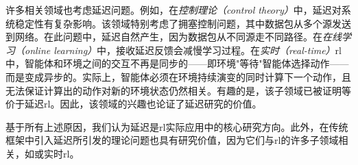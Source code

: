 许多相关领域也考虑延迟问题。例如，在\emph{控制理论（control theory）}中\cite{chung1995time, dugard1998stability, niculescu2001delay, gu2003survey, richard2003time, fridman2014introduction}，延迟对系统稳定性有复杂影响\cite{kolmanovskii1999delay}。该领域特别考虑了拥塞控制问题，其中数据包从多个源发送到网络\cite{jacobson1988congestion}。在此问题中，延迟自然产生，因为数据包从不同源走不同路径\cite{witsenhausen1971separation, altman1999congestion,ait2003stability}。在\emph{在线学习（online learning）}中，接收延迟反馈会减慢学习过程\cite{joulani2013online,pike2018bandits,lancewicki2021stochastic}。在\emph{实时（real-time）}\gls{rl}中，智能体和环境之间的交互不再是同步的——即环境"等待"智能体选择动作——而是变成异步的。实际上，智能体必须在环境持续演变的同时计算下一个动作，且无法保证计算出的动作对新的环境状态仍然相关。有趣的是，该子领域已被证明等价于延迟\gls{rl}\cite[Theorem~1]{ramstedt2019real}。因此，该领域的兴趣\cite{hester2013texplore,caarls2015parallel,travnik2018reactive,ramstedt2019real,xiao2020thinking}也论证了延迟研究的价值。

基于所有上述原因，我们认为延迟是\gls{rl}实际应用中的核心研究方向。此外，在传统框架中引入延迟所引发的理论问题也具有研究价值，因为它们与\gls{rl}的许多子领域相关，如或实时\gls{rl}。
